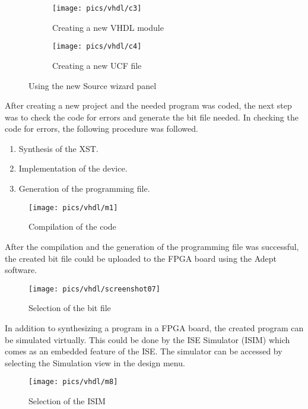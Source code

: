\pagebreak

\begin{figure}[!h]
	\centering
	\begin{subfigure}{.5\textwidth}
		\centering
		\texttt{[image: pics/vhdl/c3]}
		\caption{Creating a new VHDL module}
		\label{fig:sub1}
	\end{subfigure}%
	\begin{subfigure}{.5\textwidth}
		\centering
		\texttt{[image: pics/vhdl/c4]}
		\caption{Creating a new UCF file }
		\label{fig:sub2}
	\end{subfigure}
	\caption{Using the new Source wizard panel}
	\label{fig:animals}
\end{figure}

\noindent
After creating a new project and the needed program was coded, the next step was to check the code for errors and generate the bit file needed. In checking the code for errors, the following procedure was followed.
\begin{enumerate}
	\item Synthesis of the XST.
	\item Implementation of the device.
	\item Generation of the programming file.
\end{enumerate}

\begin{figure}[!h]
	\centering
	\texttt{[image: pics/vhdl/m1]}
	\caption{Compilation of the code}
	\label{fig:m1}
\end{figure}

\noindent
After the compilation and the generation of the programming file was successful, the created bit file could be uploaded to the FPGA board using the Adept software.

\begin{figure}[!h]
	\centering
	\texttt{[image: pics/vhdl/screenshot07]}
	\caption{Selection of the bit file}
	\label{fig:screenshot07}
\end{figure}

\noindent
In addition to synthesizing a program in a FPGA board, the created program can be simulated virtually. This could be done by the ISE Simulator (ISIM) which comes as an embedded feature of the ISE. The simulator can be accessed by selecting the Simulation view in the design menu.  

\begin{figure}[!h]
	\centering
	\texttt{[image: pics/vhdl/m8]}
	\caption{Selection of the ISIM}
	\label{fig:m8}
\end{figure}

